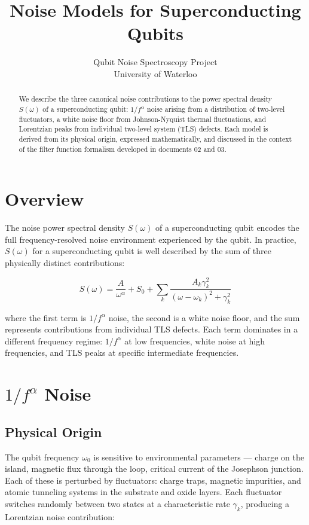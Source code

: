 \documentclass[10pt]{article}
\title{Noise Models for Superconducting Qubits}
\author{Qubit Noise Spectroscopy Project \\ University of Waterloo}
\date{}
\begin{document}
\maketitle

\begin{abstract}
We describe the three canonical noise contributions to the power spectral density $S(\omega)$ of a superconducting qubit: $1/f^\alpha$ noise arising from a distribution of two-level fluctuators, a white noise floor from Johnson-Nyquist thermal fluctuations, and Lorentzian peaks from individual two-level system (TLS) defects. Each model is derived from its physical origin, expressed mathematically, and discussed in the context of the filter function formalism developed in documents 02 and 03.
\end{abstract}

\section{Overview}

The noise power spectral density $S(\omega)$ of a superconducting qubit encodes the full frequency-resolved noise environment experienced by the qubit. In practice, $S(\omega)$ for a superconducting qubit is well described by the sum of three physically distinct contributions:

\begin{equation}
    \boxed{S(\omega) = \frac{A}{\omega^\alpha} + S_0 + \sum_k \frac{A_k \gamma_k^2}{(\omega - \omega_k)^2 + \gamma_k^2}}
\end{equation}

where the first term is $1/f^\alpha$ noise, the second is a white noise floor, and the sum represents contributions from individual TLS defects. Each term dominates in a different frequency regime: $1/f^\alpha$ at low frequencies, white noise at high frequencies, and TLS peaks at specific intermediate frequencies.

\section{\texorpdfstring{$1/f^\alpha$}{1/f} Noise}

\subsection{Physical Origin}

The qubit frequency $\omega_0$ is sensitive to environmental parameters — charge on the island, magnetic flux through the loop, critical current of the Josephson junction. Each of these is perturbed by fluctuators: charge traps, magnetic impurities, and atomic tunneling systems in the substrate and oxide layers. Each fluctuator switches randomly between two states at a characteristic rate $\gamma_k$, producing a Lorentzian noise contribution:
\end{document}
